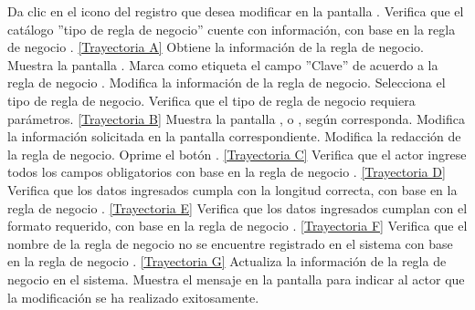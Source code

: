 	\begin{UCtrayectoria}
		\UCpaso[\UCactor] Da clic en el icono \editar del registro que desea modificar en la pantalla .
		\UCpaso[\UCsist] Verifica que el catálogo ''tipo de regla de negocio'' cuente con información, con base en la regla de negocio . \hyperlink{CU8-2:TAA}{[Trayectoria A]}
		\UCpaso[\UCsist] Obtiene la información de la regla de negocio.
		\UCpaso[\UCsist] Muestra la pantalla .
		\UCpaso[\UCsist] Marca como etiqueta el campo ''Clave'' de acuerdo a la regla de negocio .
		\UCpaso[\UCactor] Modifica la información de la regla de negocio. \label{CU8.2-P5}
		\UCpaso[\UCactor] Selecciona el tipo de regla de negocio.
		\UCpaso[\UCsist] Verifica que el tipo de regla de negocio requiera parámetros. \hyperlink{CU8-2:TAB}{[Trayectoria B]}
		\UCpaso[\UCsist] Muestra la pantalla ,  o , según corresponda.
		\UCpaso[\UCactor] Modifica la información solicitada en la pantalla correspondiente.
		\UCpaso[\UCactor] Modifica la redacción de la regla de negocio. \label{CU8.2-P11}
		\UCpaso[\UCactor] Oprime el botón . \hyperlink{CU8-2:TAC}{[Trayectoria C]}
		\UCpaso[\UCsist] Verifica que el actor ingrese todos los campos obligatorios con base en la regla de negocio . \hyperlink{CU8-2:TAD}{[Trayectoria D]}
		\UCpaso[\UCsist] Verifica que los datos ingresados cumpla con la longitud correcta, con base en la regla de negocio . \hyperlink{CU8-2:TAE}{[Trayectoria E]}
		\UCpaso[\UCsist] Verifica que los datos ingresados cumplan con el formato requerido, con base en la regla de negocio . \hyperlink{CU8-2:TAF}{[Trayectoria F]}
		\UCpaso[\UCsist] Verifica que el nombre de la regla de negocio no se encuentre registrado en el sistema con base en la regla de negocio . \hyperlink{CU8-2:TAG}{[Trayectoria G]}
		\UCpaso[\UCsist] Actualiza la información de la regla de negocio en el sistema.
		\UCpaso[\UCsist] Muestra el mensaje  en la pantalla  para indicar al actor que la modificación se ha realizado exitosamente.
	\end{UCtrayectoria}		
